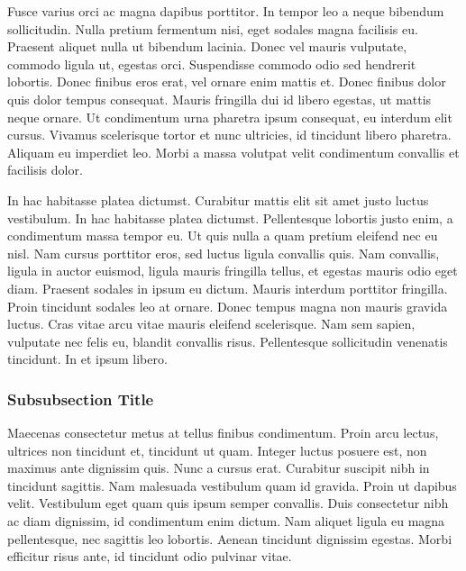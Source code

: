 \documentclass[
	11pt, %
	fleqn, %
	a4paper, %
]{LegrandOrangeBook}
\begin{document}
Fusce varius orci ac magna dapibus porttitor. In tempor leo a neque bibendum sollicitudin. Nulla pretium fermentum nisi, eget sodales magna facilisis eu. Praesent aliquet nulla ut bibendum lacinia. Donec vel mauris vulputate, commodo ligula ut, egestas orci. Suspendisse commodo odio sed hendrerit lobortis. Donec finibus eros erat, vel ornare enim mattis et. Donec finibus dolor quis dolor tempus consequat. Mauris fringilla dui id libero egestas, ut mattis neque ornare. Ut condimentum urna pharetra ipsum consequat, eu interdum elit cursus. Vivamus scelerisque tortor et nunc ultricies, id tincidunt libero pharetra. Aliquam eu imperdiet leo. Morbi a massa volutpat velit condimentum convallis et facilisis dolor.

In hac habitasse platea dictumst. Curabitur mattis elit sit amet justo luctus vestibulum. In hac habitasse platea dictumst. Pellentesque lobortis justo enim, a condimentum massa tempor eu. Ut quis nulla a quam pretium eleifend nec eu nisl. Nam cursus porttitor eros, sed luctus ligula convallis quis. Nam convallis, ligula in auctor euismod, ligula mauris fringilla tellus, et egestas mauris odio eget diam. Praesent sodales in ipsum eu dictum. Mauris interdum porttitor fringilla. Proin tincidunt sodales leo at ornare. Donec tempus magna non mauris gravida luctus. Cras vitae arcu vitae mauris eleifend scelerisque. Nam sem sapien, vulputate nec felis eu, blandit convallis risus. Pellentesque sollicitudin venenatis tincidunt. In et ipsum libero.

\subsubsection{Subsubsection Title} 

Maecenas consectetur metus at tellus finibus condimentum. Proin arcu lectus, ultrices non tincidunt et, tincidunt ut quam. Integer luctus posuere est, non maximus ante dignissim quis. Nunc a cursus erat. Curabitur suscipit nibh in tincidunt sagittis. Nam malesuada vestibulum quam id gravida. Proin ut dapibus velit. Vestibulum eget quam quis ipsum semper convallis. Duis consectetur nibh ac diam dignissim, id condimentum enim dictum. Nam aliquet ligula eu magna pellentesque, nec sagittis leo lobortis. Aenean tincidunt dignissim egestas. Morbi efficitur risus ante, id tincidunt odio pulvinar vitae.
\end{document}
